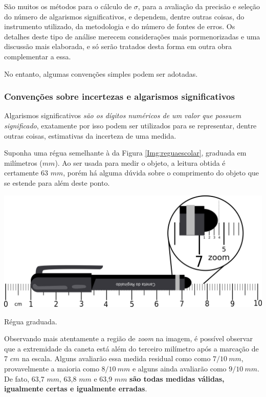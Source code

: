 \documentclass[a4paper, 11pt]{report}
\begin{document}
São muitos os métodos para o cálculo de $\sigma$, para a avaliação da precisão 
e seleção do número de algarismos significativos, e dependem, dentre outras 
coisas, do instrumento utilizado, da metodologia e do número de fontes de erros.
Os detalhes deste tipo de análise merecem considerações mais pormenorizadas e 
uma discussão mais elaborada, e só serão tratados desta forma em outra obra 
complementar a essa. 

No entanto, algumas convenções simples podem ser adotadas.

\subsubsection{Convenções sobre incertezas e algarismos significativos}
Algarismos significativos \emph{são os dígitos numéricos de um valor que 
possuem significado}, exatamente por isso podem ser utilizados para se 
representar, dentre outras coisas, estimativas da incerteza de uma medida.

Suponha uma régua semelhante à da Figura \ref{Img:reguaescolar}, 
graduada em milímetros ($mm$). Ao ser usada para medir o 
objeto, a leitura obtida é certamente 63 $mm$, porém há alguma 
dúvida sobre o comprimento do objeto que se estende para além deste ponto. 

\begin{staticfigure}
    \centering
    \includegraphics[scale=.45]{img/reguaescolar.png}
    \caption{\footnotesize Régua graduada.}
    \label{Img:reguaescolar}
\end{staticfigure}

Observando mais atentamente a região de \emph{zoom} na imagem, é possível 
observar que a extremidade da caneta está além do terceiro milímetro após a 
marcação de 7 $cm$ na escala. Alguns avaliarão essa medida residual como 
como $7/10 \: mm$, provavelmente a maioria como $8/10 \: mm$ e
alguns ainda avaliarão como $9/10 \: mm$. De fato, 63,7 $mm$, 63,8 $mm$ e 
63,9 $mm$ \textbf{são todas medidas válidas, igualmente certas e igualmente 
erradas}.
\end{document}
